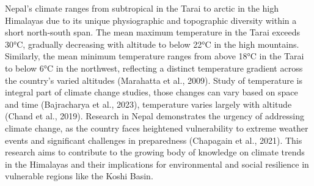 Nepal's climate ranges from subtropical in the Tarai to arctic in the high Himalayas due to its unique physiographic and topographic diversity within a short north-south span. The mean maximum temperature in the Tarai exceeds 30°C, gradually decreasing with altitude to below 22°C in the high mountains. Similarly, the mean minimum temperature ranges from above 18°C in the Tarai to below 6°C in the northwest, reflecting a distinct temperature gradient across the country's varied altitudes (Marahatta et al., 2009).
Study of temperature is integral part of climate change studies, those changes can vary based on space and time (Bajracharya et al., 2023), temperature varies largely with altitude (Chand et al., 2019). Research in Nepal demonstrates the urgency of addressing climate change, as the country faces heightened vulnerability to extreme weather events and significant challenges in preparedness (Chapagain et al., 2021). This research aims to contribute to the growing body of knowledge on climate trends in the Himalayas and their implications for environmental and social resilience in vulnerable regions like the Koshi Basin.

